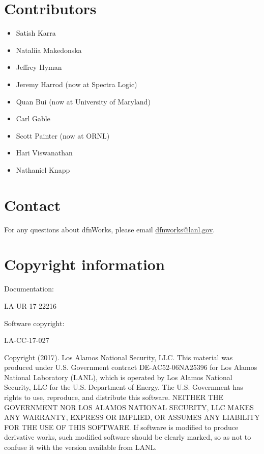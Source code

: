 \documentclass[letterpaper,10pt,english]{sphinxmanual}
\begin{document}
\section{Contributors}
\label{intro:contributors}\begin{itemize}
\item {} 
Satish Karra

\item {} 
Nataliia Makedonska

\item {} 
Jeffrey Hyman

\item {} 
Jeremy Harrod (now at Spectra Logic)

\item {} 
Quan Bui (now at University of Maryland)

\item {} 
Carl Gable

\item {} 
Scott Painter (now at ORNL)

\item {} 
Hari Viswanathan

\item {} 
Nathaniel Knapp

\end{itemize}


\section{Contact}
\label{intro:contact}
For any questions about dfnWorks, please email \href{mailto:dfnworks@lanl.gov}{dfnworks@lanl.gov}.


\section{Copyright information}
\label{intro:copyright-information}
Documentation:

LA-UR-17-22216

Software copyright:

LA-CC-17-027

Copyright (2017).  Los Alamos National Security, LLC. This material was
produced under U.S. Government contract DE-AC52-06NA25396 for Los Alamos
National Laboratory (LANL), which is operated by Los Alamos National Security,
LLC for the U.S. Department of Energy. The U.S. Government has rights to use,
reproduce, and distribute this software.  NEITHER THE GOVERNMENT NOR LOS ALAMOS
NATIONAL SECURITY, LLC MAKES ANY WARRANTY, EXPRESS OR IMPLIED, OR ASSUMES ANY
LIABILITY FOR THE USE OF THIS SOFTWARE.  If software is modified to produce
derivative works, such modified software should be clearly marked, so as not
to confuse it with the version available from LANL.
\end{document}
